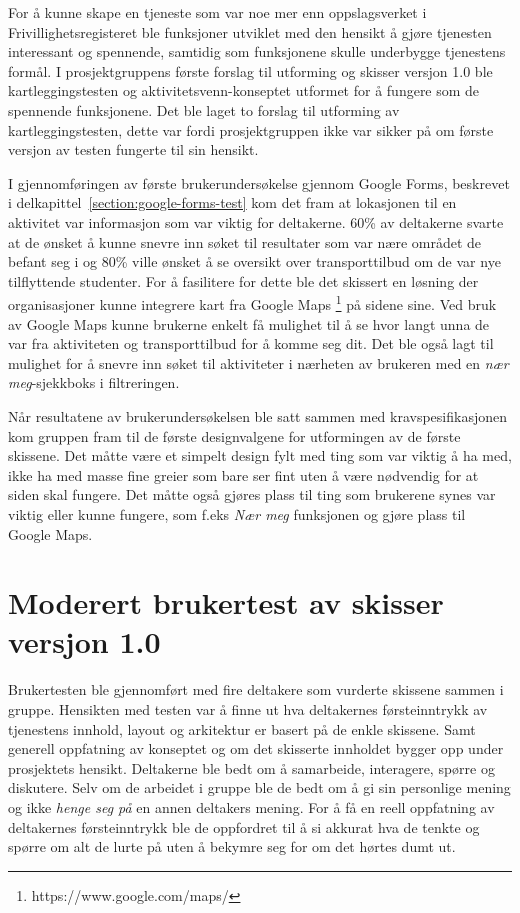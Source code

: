 For å kunne skape en tjeneste som var noe mer enn oppslagsverket i Frivillighetsregisteret ble funksjoner utviklet med den hensikt å gjøre tjenesten interessant og spennende, samtidig som funksjonene skulle underbygge tjenestens formål. I prosjektgruppens første forslag til utforming og skisser versjon 1.0 ble kartleggingstesten og aktivitetsvenn-konseptet utformet for å fungere som de spennende funksjonene. Det ble laget to forslag til utforming av kartleggingstesten, dette var fordi prosjektgruppen ikke var sikker på om første versjon av testen fungerte til sin hensikt.

I gjennomføringen av første brukerundersøkelse gjennom Google Forms, beskrevet i delkapittel~\ref{section:google-forms-test} kom det fram at lokasjonen til en aktivitet var informasjon som var viktig for deltakerne. 60\% av deltakerne svarte at de ønsket å kunne snevre inn søket til resultater som var nære området de befant seg i og 80\% ville ønsket å se oversikt over transporttilbud om de var nye tilflyttende studenter. For å fasilitere for dette ble det skissert en løsning der organisasjoner kunne integrere kart fra Google Maps \footnote{https://www.google.com/maps/} på sidene sine. Ved bruk av Google Maps kunne brukerne enkelt få mulighet til å se hvor langt unna de var fra aktiviteten og transporttilbud for å komme seg dit. Det ble også lagt til mulighet for å snevre inn søket til aktiviteter i nærheten av brukeren med en {\em  nær meg}-sjekkboks i filtreringen.

Når resultatene av brukerundersøkelsen ble satt sammen med kravspesifikasjonen kom gruppen fram til de første designvalgene for utformingen av de første skissene.
Det måtte være et simpelt design fylt med ting som var viktig å ha med, ikke ha med masse fine greier som bare ser fint uten å være nødvendig for at siden skal fungere. Det måtte også gjøres plass til ting som brukerene synes var viktig eller kunne fungere, som f.eks {\em Nær meg} funksjonen og gjøre plass til Google Maps.

\section{Moderert brukertest av skisser versjon 1.0}
\label{section:Moderert brukertest-skisser-1}

Brukertesten ble gjennomført med fire deltakere som vurderte skissene sammen i gruppe. Hensikten med testen var å finne ut hva deltakernes førsteinntrykk av tjenestens innhold, layout og arkitektur er basert på de enkle skissene. Samt generell oppfatning av konseptet og om det skisserte innholdet bygger opp under prosjektets hensikt. Deltakerne ble bedt om å samarbeide, interagere, spørre og diskutere. Selv om de arbeidet i gruppe ble de bedt om å gi sin personlige mening og ikke {\em henge seg på} en annen deltakers mening. For å få en reell oppfatning av deltakernes førsteinntrykk ble de oppfordret til å si akkurat hva de tenkte og spørre om alt de lurte på uten å bekymre seg for om det hørtes dumt ut.

